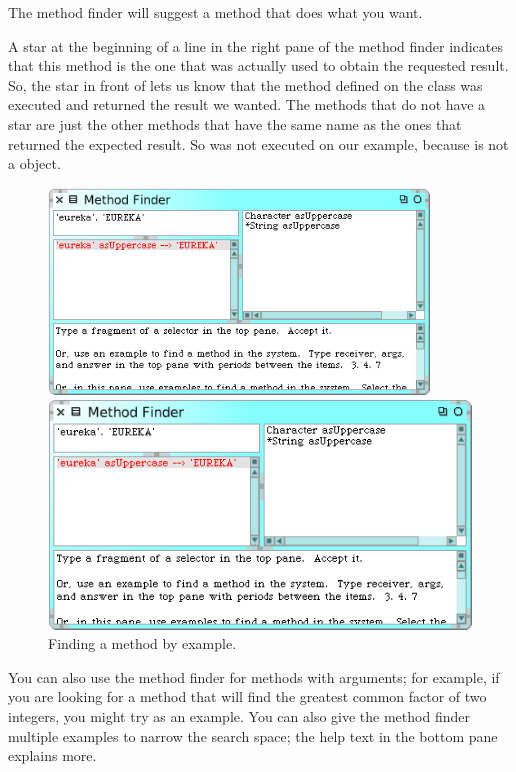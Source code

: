 \documentclass[a4paper,10pt,twoside]{book}
\begin{document}
\noindent
The method finder will suggest a method that does what you want.

A star at the beginning of a line in the right pane of the method finder indicates that this method is the one that was actually used to obtain the requested result. 
So, the star in front of  lets us know that the method  defined on the class  was executed and returned the result we wanted. The methods that do not have a star are just the other methods that have the same name as the ones that returned the expected result. So  was not executed on our example, because  is not a  object.

\begin{figure}[hbt]
\ifluluelse
	{\centerline {\includegraphics[width=0.9\textwidth]{MethodFinder-example1}}}
	{\centerline {\includegraphics[scale=0.7]{MethodFinder-example1}}}
\caption{Finding a method by example.
\label{fig:methodFinder-example1}}
\end{figure}

You can also use the method finder for methods with arguments; for example, if you are looking for a method that will find the greatest common factor of two integers, you might try  as an example.  You can also give the method finder multiple examples to narrow the search space; the help text in the bottom pane explains more.
\end{document}
